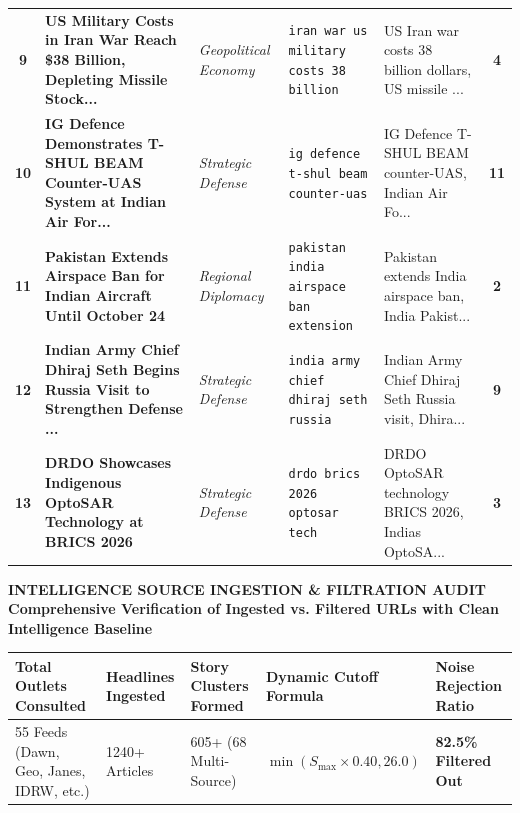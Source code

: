 \documentclass[8.5pt,a4paper]{article}
\begin{document}
{\begin{tabularx}{\textwidth}{@{} c p{5.4cm} p{2.2cm} p{4.3cm} p{4.3cm} c @{}}
\rowcolor{rowlight}
\textbf{9} & \textbf{US Military Costs in Iran War Reach \$38 Billion, Depleting Missile Stock...} & \textit{Geopolitical Economy} & \texttt{iran war us military costs 38 billion} & US Iran war costs 38 billion dollars, US missile ... & \textbf{4} \\
\rowcolor{rowdark}
\textbf{10} & \textbf{IG Defence Demonstrates T-SHUL BEAM Counter-UAS System at Indian Air For...} & \textit{Strategic Defense} & \texttt{ig defence t-shul beam counter-uas} & IG Defence T-SHUL BEAM counter-UAS, Indian Air Fo... & \textbf{11} \\
\rowcolor{rowlight}
\textbf{11} & \textbf{Pakistan Extends Airspace Ban for Indian Aircraft Until October 24} & \textit{Regional Diplomacy} & \texttt{pakistan india airspace ban extension} & Pakistan extends India airspace ban, India Pakist... & \textbf{2} \\
\rowcolor{rowdark}
\textbf{12} & \textbf{Indian Army Chief Dhiraj Seth Begins Russia Visit to Strengthen Defense ...} & \textit{Strategic Defense} & \texttt{india army chief dhiraj seth russia} & Indian Army Chief Dhiraj Seth Russia visit, Dhira... & \textbf{9} \\
\rowcolor{rowlight}
\textbf{13} & \textbf{DRDO Showcases Indigenous OptoSAR Technology at BRICS 2026} & \textit{Strategic Defense} & \texttt{drdo brics 2026 optosar tech} & DRDO OptoSAR technology BRICS 2026, Indias OptoSA... & \textbf{3} \\
\bottomrule
\end{tabularx}
}

\newpage
\begin{center}
{\Large \bfseries \color{primary} INTELLIGENCE SOURCE INGESTION \& FILTRATION AUDIT}\\[2pt]
{\small \bfseries \color{accent} Comprehensive Verification of Ingested vs. Filtered URLs with Clean Intelligence Baseline}
\end{center}
\vspace{-4pt}

\vspace{1pt}

{\fontsize{7.5pt}{8.5pt}\selectfont
\begin{tabularx}{\textwidth}{@{} X X X X X @{}}
\toprule
\rowcolor{tableheader}
\textbf{Total Outlets Consulted} & \textbf{Headlines Ingested} & \textbf{Story Clusters Formed} & \textbf{Dynamic Cutoff Formula} & \textbf{Noise Rejection Ratio} \\
\midrule
\rowcolor{rowlight}
55 Feeds (Dawn, Geo, Janes, IDRW, etc.) & 1240+ Articles & 605+ (68 Multi-Source) & $\min(S_{\max} \times 0.40, 26.0)$ & \textbf{82.5\% Filtered Out} \\
\bottomrule
\end{tabularx}
}
\vspace{2pt}
\end{document}
